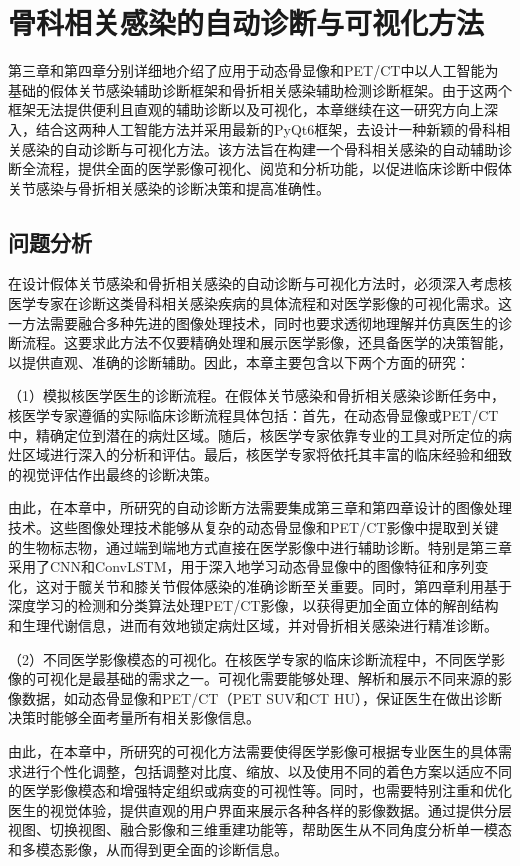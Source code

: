 \chapter{骨科相关感染的自动诊断与可视化方法}

第三章和第四章分别详细地介绍了应用于动态骨显像和PET/CT中以人工智能为基础的假体关节感染辅助诊断框架和骨折相关感染辅助检测诊断框架。由于这两个框架无法提供便利且直观的辅助诊断以及可视化，本章继续在这一研究方向上深入，结合这两种人工智能方法并采用最新的PyQt6框架，去设计一种新颖的骨科相关感染的自动诊断与可视化方法。该方法旨在构建一个骨科相关感染的自动辅助诊断全流程，提供全面的医学影像可视化、阅览和分析功能，以促进临床诊断中假体关节感染与骨折相关感染的诊断决策和提高准确性。

\section{问题分析}

在设计假体关节感染和骨折相关感染的自动诊断与可视化方法时，必须深入考虑核医学专家在诊断这类骨科相关感染疾病的具体流程和对医学影像的可视化需求。这一方法需要融合多种先进的图像处理技术，同时也要求透彻地理解并仿真医生的诊断流程。这要求此方法不仅要精确处理和展示医学影像，还具备医学的决策智能，以提供直观、准确的诊断辅助。因此，本章主要包含以下两个方面的研究：

（1）模拟核医学医生的诊断流程。在假体关节感染和骨折相关感染诊断任务中，核医学专家遵循的实际临床诊断流程具体包括：首先，在动态骨显像或PET/CT中，精确定位到潜在的病灶区域。随后，核医学专家依靠专业的工具对所定位的病灶区域进行深入的分析和评估。最后，核医学专家将依托其丰富的临床经验和细致的视觉评估作出最终的诊断决策。

由此，在本章中，所研究的自动诊断方法需要集成第三章和第四章设计的图像处理技术。这些图像处理技术能够从复杂的动态骨显像和PET/CT影像中提取到关键的生物标志物，通过端到端地方式直接在医学影像中进行辅助诊断。特别是第三章采用了CNN和ConvLSTM，用于深入地学习动态骨显像中的图像特征和序列变化，这对于髋关节和膝关节假体感染的准确诊断至关重要。同时，第四章利用基于深度学习的检测和分类算法处理PET/CT影像，以获得更加全面立体的解剖结构和生理代谢信息，进而有效地锁定病灶区域，并对骨折相关感染进行精准诊断。

（2）不同医学影像模态的可视化。在核医学专家的临床诊断流程中，不同医学影像的可视化是最基础的需求之一。可视化需要能够处理、解析和展示不同来源的影像数据，如动态骨显像和PET/CT（PET SUV和CT HU），保证医生在做出诊断决策时能够全面考量所有相关影像信息。

由此，在本章中，所研究的可视化方法需要使得医学影像可根据专业医生的具体需求进行个性化调整，包括调整对比度、缩放、以及使用不同的着色方案以适应不同的医学影像模态和增强特定组织或病变的可视性等。同时，也需要特别注重和优化医生的视觉体验，提供直观的用户界面来展示各种各样的影像数据。通过提供分层视图、切换视图、融合影像和三维重建功能等，帮助医生从不同角度分析单一模态和多模态影像，从而得到更全面的诊断信息。


